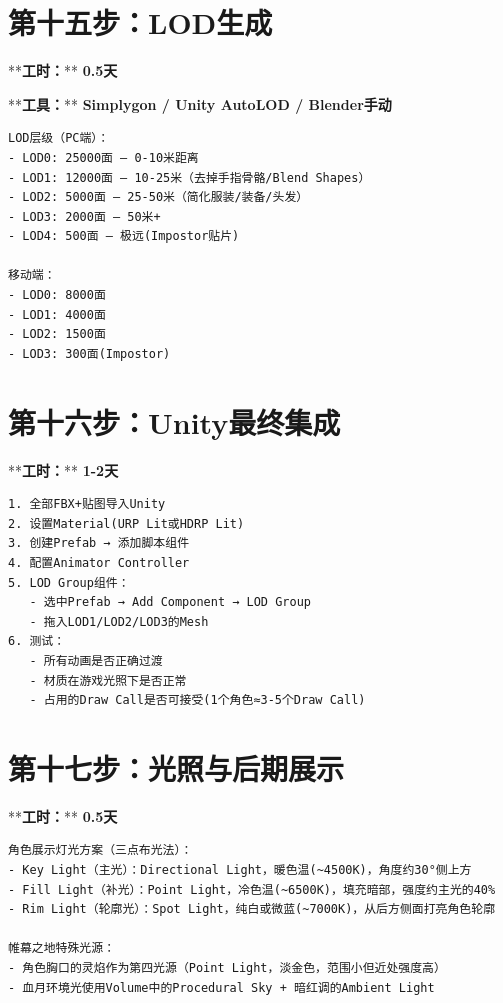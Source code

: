 \documentclass[12pt,a4paper,openany]{ctexbook}
\begin{document}
\section*{第十五步：LOD生成}


**\textbf{工时：}**\textbf{ 0.5天}

**\textbf{工具：}**\textbf{ Simplygon / Unity AutoLOD / Blender手动}


\begin{verbatim}
LOD层级（PC端）：
- LOD0: 25000面 — 0-10米距离
- LOD1: 12000面 — 10-25米（去掉手指骨骼/Blend Shapes）
- LOD2: 5000面 — 25-50米（简化服装/装备/头发）
- LOD3: 2000面 — 50米+
- LOD4: 500面 — 极远(Impostor贴片)

移动端：
- LOD0: 8000面
- LOD1: 4000面
- LOD2: 1500面
- LOD3: 300面(Impostor)
\end{verbatim}


\section*{第十六步：Unity最终集成}


**\textbf{工时：}**\textbf{ 1-2天}


\begin{verbatim}
1. 全部FBX+贴图导入Unity
2. 设置Material(URP Lit或HDRP Lit)
3. 创建Prefab → 添加脚本组件
4. 配置Animator Controller
5. LOD Group组件：
   - 选中Prefab → Add Component → LOD Group
   - 拖入LOD1/LOD2/LOD3的Mesh
6. 测试：
   - 所有动画是否正确过渡
   - 材质在游戏光照下是否正常
   - 占用的Draw Call是否可接受(1个角色≈3-5个Draw Call)
\end{verbatim}


\section*{第十七步：光照与后期展示}


**\textbf{工时：}**\textbf{ 0.5天}


\begin{verbatim}
角色展示灯光方案（三点布光法）：
- Key Light（主光）：Directional Light，暖色温(~4500K)，角度约30°侧上方
- Fill Light（补光）：Point Light，冷色温(~6500K)，填充暗部，强度约主光的40%
- Rim Light（轮廓光）：Spot Light，纯白或微蓝(~7000K)，从后方侧面打亮角色轮廓

帷幕之地特殊光源：
- 角色胸口的灵焰作为第四光源（Point Light，淡金色，范围小但近处强度高）
- 血月环境光使用Volume中的Procedural Sky + 暗红调的Ambient Light
\end{verbatim}
\end{document}
